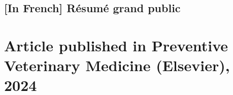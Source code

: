  
\subsection{[In French] Résumé grand public}



\section{Article published in Preventive Veterinary Medicine (Elsevier), 2024}




